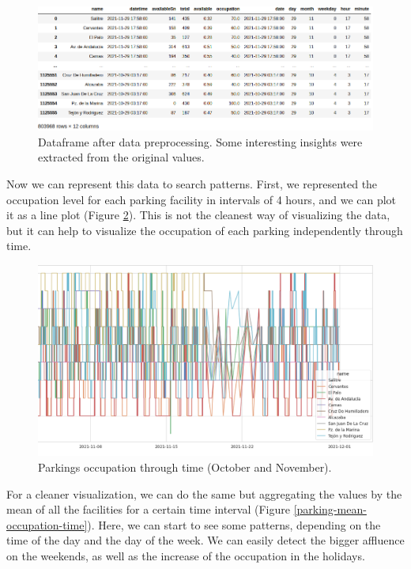 \begin{figure}[H]
	\centering
	\includegraphics[width=1\linewidth]{imagenes/dataframe-no-processing.png}
	\caption{Dataframe after data preprocessing. Some interesting insights were extracted from the original values.}
	\label{dataframe-no-preprocessing}
\end{figure}

Now we can represent this data to search patterns. First, we represented the occupation level for each parking facility in intervals of 4 hours, and we can plot it as a line plot (Figure \ref{parking-occupation-time}). This is not the cleanest way of visualizing the data, but it can help to visualize the occupation of each parking independently through time.

\begin{figure}[H]
	\centering
	\includegraphics[width=1\linewidth]{imagenes/parking-occupation-time.png}
	\caption{Parkings occupation through time (October and November).}
	\label{parking-occupation-time}
\end{figure}

For a cleaner visualization, we can do the same but aggregating the values by the mean of all the facilities for a certain time interval (Figure \ref{parking-mean-occupation-time}). Here, we can start to see some patterns, depending on the time of the day and the day of the week. We can easily detect the bigger affluence on the weekends, as well as the increase of the occupation in the holidays.

